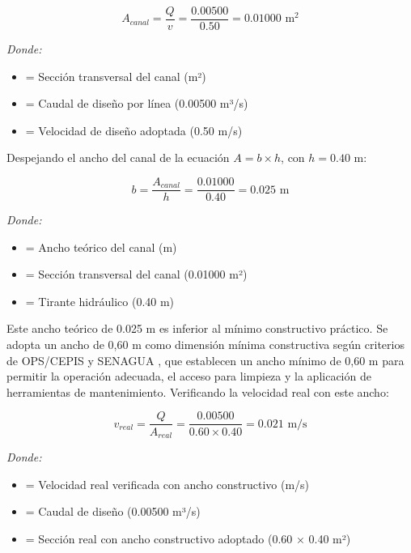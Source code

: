 \documentclass[12pt,a4paper]{article}
\begin{document}
\begin{equation}
A_{canal} = \frac{Q}{v} = \frac{0.00500}{0.50} = 0.01000 \text{ m}^2
\end{equation}

\textit{Donde:}
\begin{itemize}[noitemsep,leftmargin=2em]
    \item[$A_{canal}$] = Sección transversal del canal (m²)
    \item[$Q$] = Caudal de diseño por línea (0.00500 m³/s)
    \item[$v$] = Velocidad de diseño adoptada (0.50 m/s)
\end{itemize}

Despejando el ancho del canal de la ecuación $A = b \times h$, con $h = 0.40$ m:

\begin{equation}
b = \frac{A_{canal}}{h} = \frac{0.01000}{0.40} = 0.025 \text{ m}
\end{equation}

\textit{Donde:}
\begin{itemize}[noitemsep,leftmargin=2em]
    \item[$b$] = Ancho teórico del canal (m)
    \item[$A_{canal}$] = Sección transversal del canal (0.01000 m²)
    \item[$h$] = Tirante hidráulico (0.40 m)
\end{itemize}

Este ancho teórico de 0.025 m es inferior al mínimo constructivo práctico. Se adopta un ancho de 0,60 m como dimensión mínima constructiva según criterios de OPS/CEPIS \cite{ops2005} y SENAGUA \cite{senagua2012}, que establecen un ancho mínimo de 0,60 m para permitir la operación adecuada, el acceso para limpieza y la aplicación de herramientas de mantenimiento. Verificando la velocidad real con este ancho:

\begin{equation}
v_{real} = \frac{Q}{A_{real}} = \frac{0.00500}{0.60 \times 0.40} = 0.021 \text{ m/s}
\end{equation}

\textit{Donde:}
\begin{itemize}[noitemsep,leftmargin=2em]
    \item[$v_{real}$] = Velocidad real verificada con ancho constructivo (m/s)
    \item[$Q$] = Caudal de diseño (0.00500 m³/s)
    \item[$A_{real}$] = Sección real con ancho constructivo adoptado (0.60 × 0.40 m²)
\end{itemize}
\end{document}
